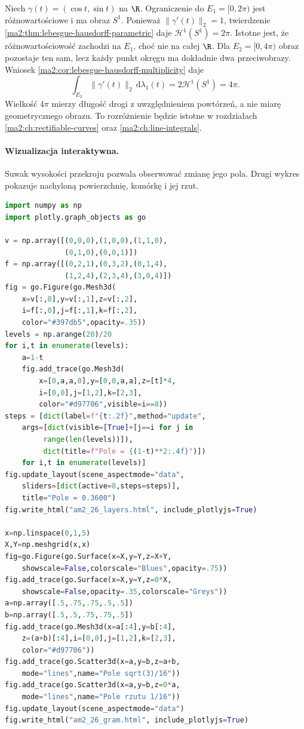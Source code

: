 \begin{przyklad}
\label{ma2:ex:lebesgue-hausdorff-double-circle}
Niech $\gamma(t)=(\cos t,\sin t)$ na $\R$.
Ograniczenie do $E_1=[0,2\pi)$ jest
różnowartościowe i ma obraz $S^1$.
Ponieważ $\|\gamma'(t)\|_2=1$,
twierdzenie \ref{ma2:thm:lebesgue-hausdorff-parametric}
daje $\mathcal H^1(S^1)=2\pi$.
Istotne jest, że różnowartościowość zachodzi
na $E_1$, choć nie na całej $\R$.
Dla $E_2=[0,4\pi)$ obraz pozostaje ten
sam, lecz każdy punkt okręgu ma dokładnie
dwa przeciwobrazy. Wniosek
\ref{ma2:cor:lebesgue-hausdorff-multiplicity}
daje
\[
 \int_{E_2}\|\gamma'(t)\|_2\,
           \mathrm d\lambda_1(t)
 =2\mathcal H^1(S^1)=4\pi.
\]
Wielkość $4\pi$ mierzy długość drogi
z uwzględnieniem powtórzeń, a nie
miarę geometrycznego obrazu.
To rozróżnienie będzie istotne w rozdziałach
\ref{ma2:ch:rectifiable-curves}
oraz \ref{ma2:ch:line-integrals}.
\end{przyklad}


\paragraph{Wizualizacja interaktywna.}
Suwak wysokości przekroju pozwala obserwować
zmianę jego pola. Drugi wykres pokazuje
nachyloną powierzchnię, komórkę i jej rzut.
\begin{lstlisting}[language=Python]
import numpy as np
import plotly.graph_objects as go

v = np.array([(0,0,0),(1,0,0),(1,1,0),
              (0,1,0),(0,0,1)])
f = np.array([(0,2,1),(0,3,2),(0,1,4),
              (1,2,4),(2,3,4),(3,0,4)])
fig = go.Figure(go.Mesh3d(
    x=v[:,0],y=v[:,1],z=v[:,2],
    i=f[:,0],j=f[:,1],k=f[:,2],
    color="#397db5",opacity=.35))
levels = np.arange(20)/20
for i,t in enumerate(levels):
    a=1-t
    fig.add_trace(go.Mesh3d(
        x=[0,a,a,0],y=[0,0,a,a],z=[t]*4,
        i=[0,0],j=[1,2],k=[2,3],
        color="#d97706",visible=i==8))
steps = [dict(label=f"{t:.2f}",method="update",
    args=[dict(visible=[True]+[j==i for j in
         range(len(levels))]),
         dict(title=f"Pole = {(1-t)**2:.4f}")])
    for i,t in enumerate(levels)]
fig.update_layout(scene_aspectmode="data",
    sliders=[dict(active=8,steps=steps)],
    title="Pole = 0.3600")
fig.write_html("am2_26_layers.html", include_plotlyjs=True)

x=np.linspace(0,1,5)
X,Y=np.meshgrid(x,x)
fig=go.Figure(go.Surface(x=X,y=Y,z=X+Y,
    showscale=False,colorscale="Blues",opacity=.75))
fig.add_trace(go.Surface(x=X,y=Y,z=0*X,
    showscale=False,opacity=.35,colorscale="Greys"))
a=np.array([.5,.75,.75,.5,.5])
b=np.array([.5,.5,.75,.75,.5])
fig.add_trace(go.Mesh3d(x=a[:4],y=b[:4],
    z=(a+b)[:4],i=[0,0],j=[1,2],k=[2,3],
    color="#d97706"))
fig.add_trace(go.Scatter3d(x=a,y=b,z=a+b,
    mode="lines",name="Pole sqrt(3)/16"))
fig.add_trace(go.Scatter3d(x=a,y=b,z=0*a,
    mode="lines",name="Pole rzutu 1/16"))
fig.update_layout(scene_aspectmode="data")
fig.write_html("am2_26_gram.html", include_plotlyjs=True)
\end{lstlisting}

